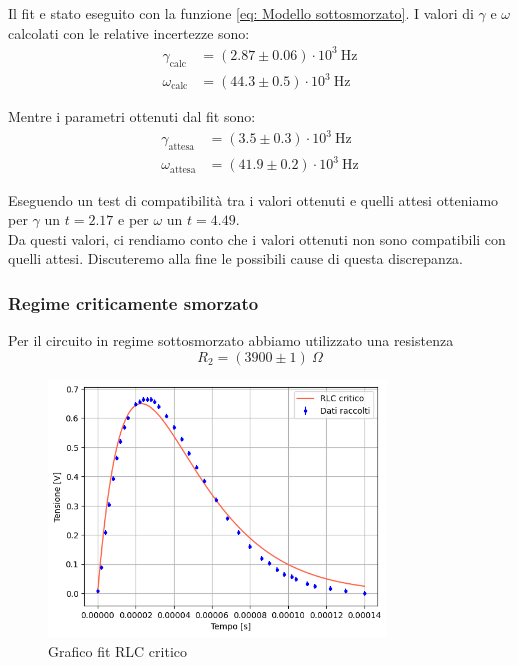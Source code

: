 \documentclass[letterpaper,12pt]{article}
\begin{document}
Il fit e stato eseguito con la funzione \eqref{eq: Modello sottosmorzato}.
I valori di $\gamma$ e $\omega$ calcolati con le relative incertezze sono:
\begin{align*}
    \gamma_\text{calc} & = (2.87 \pm 0.06) \cdot 10^3\ \text{Hz} \\
    \omega_\text{calc} & = (44.3 \pm 0.5) \cdot 10^3\ \text{Hz}
\end{align*}

Mentre i parametri ottenuti dal fit sono:
\begin{align*}
    \gamma_\text{attesa} & = (3.5 \pm 0.3) \cdot 10^3\ \text{Hz} \\
    \omega_\text{attesa} & = (41.9 \pm 0.2) \cdot 10^3\ \text{Hz}
\end{align*}

Eseguendo un test di compatibilità tra i valori ottenuti e quelli attesi otteniamo per $\gamma$ un $t = 2.17$ e per $\omega$ un $t = 4.49$.\\
Da questi valori, ci rendiamo conto che i valori ottenuti non sono compatibili con quelli attesi. 
Discuteremo alla fine le possibili cause di questa discrepanza. \\

\newpage

\subsubsection{Regime criticamente smorzato}
Per il circuito in regime sottosmorzato abbiamo utilizzato una resistenza $$R_2 =(3900\pm1)\ \Omega $$


\begin{figure}[h!]
	\centering
	\includegraphics[width=0.8\textwidth]{RLCcritic.png}
	\caption{Grafico fit RLC critico}
	\label{fig:fitRLCcritic}
\end{figure}
\newpage
\end{document}
